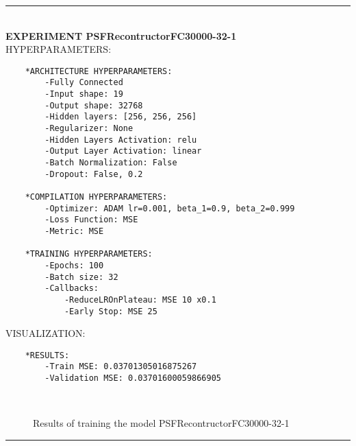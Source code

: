 \rule{0.5\textwidth}{0.5pt}\\

	{\large \textbf{EXPERIMENT PSFRecontructorFC30000-32-1}}\\
	
	{\normalsize HYPERPARAMETERS:}
	\begin{lstlisting}
	*ARCHITECTURE HYPERPARAMETERS:
		-Fully Connected
		-Input shape: 19
		-Output shape: 32768
		-Hidden layers: [256, 256, 256]
		-Regularizer: None
		-Hidden Layers Activation: relu
		-Output Layer Activation: linear
		-Batch Normalization: False
		-Dropout: False, 0.2
	
	*COMPILATION HYPERPARAMETERS:
		-Optimizer: ADAM lr=0.001, beta_1=0.9, beta_2=0.999
		-Loss Function: MSE
		-Metric: MSE
	
	*TRAINING HYPERPARAMETERS:
		-Epochs: 100
		-Batch size: 32
		-Callbacks: 
			-ReduceLROnPlateau: MSE 10 x0.1
			-Early Stop: MSE 25
	\end{lstlisting}
	
	{\normalsize VISUALIZATION:}
	\begin{lstlisting}
    *RESULTS:
        -Train MSE: 0.03701305016875267
        -Validation MSE: 0.03701600059866905
	\end{lstlisting}
	
	\begin{figure*}[ht!]
		\hspace{\fill}
		\hspace{\fill}	
		\\
		\caption{Results of training the model PSFRecontructorFC30000-32-1}
	\end{figure*}
	
\FloatBarrier	
\rule{0.5\textwidth}{0.5pt}\\